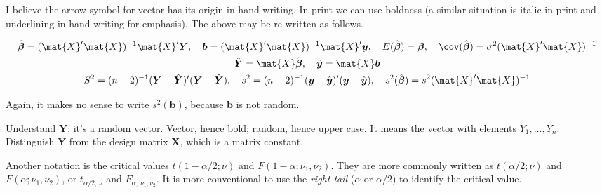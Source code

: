 \documentclass[12pt]{article}
\begin{document}
I believe the arrow symbol for vector has its origin in hand-writing.
In print we can use boldness (a similar situation is italic in print and
underlining in hand-writing for emphasis).
The above may be re-written as follows.

\renewcommand\vec[1]{\boldsymbol{#1}}

\begin{gather*}
\hat{\vec{\beta}} = (\mat{X}'\mat{X})^{-1}\mat{X}'\vec{Y}
,\quad
\vec{b} = (\mat{X}'\mat{X})^{-1}\mat{X}'\vec{y}
,\quad
E(\hat{\vec{\beta}}) = \vec{\beta}
,\quad
\cov(\hat{\vec{\beta}}) = \sigma^2 (\mat{X}'\mat{X})^{-1}
\\
\hat{\vec{Y}} = \mat{X} \hat{\vec{\beta}}
,\quad
\hat{\vec{y}} = \mat{X} \vec{b}
\\
S^2 = (n-2)^{-1} (\vec{Y} - \hat{\vec{Y}})'(\vec{Y} - \hat{\vec{Y}})
,\quad
s^2 = (n-2)^{-1} (\vec{y} - \hat{\vec{y}})'(\vec{y} - \hat{\vec{y}})
,\quad
s^2(\hat{\vec{\beta}}) = s^2 (\mat{X}'\mat{X})^{-1}
\end{gather*}

Again, it makes no sense to write $s^2(\vec{b})$, because
$\vec{b}$ is not random.

Understand $\vec{Y}$: it's a random vector.
Vector, hence bold; random, hence upper case.
It means the vector with elements
$Y_1,\dotsc,Y_n$.
Distinguish $\vec{Y}$ from the design matrix $\vec{X}$,
which is a matrix constant.

\bigskip

Another notation is the critical values
$t(1-\alpha/2; \nu)$
and
$F(1-\alpha; \nu_1,\nu_2)$.
They are more commonly written as
$t(\alpha/2; \nu)$ and
$F(\alpha; \nu_1,\nu_2)$,
or
$t_{\alpha/2;\, \nu}$ and
$F_{\alpha;\, \nu_1,\nu_2}$.
It is more conventional to use the \emph{right tail}
(\ie $\alpha$ or $\alpha/2$) to identify the critical value.
\end{document}
